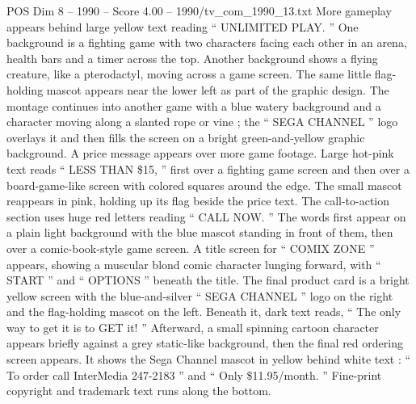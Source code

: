 \begin{textsample}{POS Dim 8 – 1990 – Score 4.00 – 1990/tv\_com\_1990\_13.txt}
More gameplay appears behind large yellow text reading “ UNLIMITED PLAY. ” One background is a fighting game with two characters facing each other in an arena, health bars and a timer across the top.
Another background shows a flying creature, like a pterodactyl, moving across a game screen.
The same little flag-holding mascot appears near the lower left as part of the graphic design.
The montage continues into another game with a blue watery background and a character moving along a slanted rope or vine ; the “ SEGA CHANNEL ” logo overlays it and then fills the screen on a bright green-and-yellow graphic background.
A price message appears over more game footage.
Large hot-pink text reads “ LESS THAN \$15, ” first over a fighting game screen and then over a board-game-like screen with colored squares around the edge.
The small mascot reappears in pink, holding up its flag beside the price text.
The call-to-action section uses huge red letters reading “ CALL NOW. ” The words first appear on a plain light background with the blue mascot standing in front of them, then over a comic-book-style game screen.
A title screen for “ COMIX ZONE ” appears, showing a muscular blond comic character lunging forward, with “ START ” and “ OPTIONS ” beneath the title.
The final product card is a bright yellow screen with the blue-and-silver “ SEGA CHANNEL ” logo on the right and the flag-holding mascot on the left.
Beneath it, dark text reads, “ The only way to get it is to GET it! ” Afterward, a small spinning cartoon character appears briefly against a grey static-like background, then the final red ordering screen appears.
It shows the Sega Channel mascot in yellow behind white text : “ To order call InterMedia 247-2183 ” and “ Only \$11.95/month. ” Fine-print copyright and trademark text runs along the bottom.

\end{textsample}
